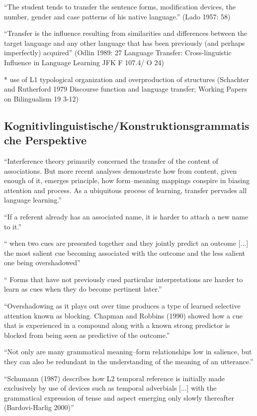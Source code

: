 ``The student tends to transfer the sentence forms, modification devices, the number, gender and case patterns of
his native language.'' (Lado 1957: 58)

``Transfer is the influence resulting from similarities and differences between the target language and any other
language that has been previously (and perhaps imperfectly) acquired'' (Odlin 1989: 27 Language Transfer: Cross-linguistic Influence in Language Learning
JFK F 107.4/ O 24)

* use of L1 typological organization and overproduction of structures (Schachter and Rutherford 1979 Discourse function and language transfer; Working Papers on Bilingualism 19 3-12)

\subsection{Kognitivlinguistische/Konstruktionsgrammatische Perspektive}

\cite{Ellis06} ``Interference theory primarily concerned the transfer of the content of
associations. But more recent analyses demonstrate how from content, given
enough of it, emerges principle, how form–meaning mappings conspire in
biasing attention and process. As a ubiquitous process of learning, transfer
pervades all language learning.''

``If a referent already has an associated name, it is harder to
attach a new name to it.''

`` when two cues are presented together and they
jointly predict an outcome [...] the most salient cue becoming associated with the
outcome and the less salient one being overshadowed''

`` Forms that have not
previously cued particular interpretations are harder to learn as cues when
they do become pertinent later.''

``Overshadowing as it plays out over time produces a type of learned
selective attention known as blocking. Chapman and Robbins (1990) showed
how a cue that is experienced in a compound along with a known strong
predictor is blocked from being seen as predictive of the outcome.''

``Not only are many grammatical meaning–form relationships low in salience,
but they can also be redundant in the understanding of the meaning of
an utterance.''

``Schumann (1987) describes how L2 temporal reference is initially made exclusively
by use of devices such as temporal adverbials [...] with the grammatical expression of tense and aspect emerging only
slowly thereafter (Bardovi-Harlig 2000)''

